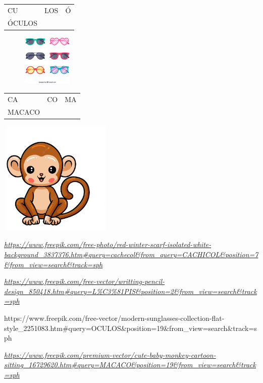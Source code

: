 \begin{longtable}[]{@{}lll@{}}
\toprule
CU & LOS & Ó\tabularnewline
ÓCULOS\tabularnewline
\bottomrule
\end{longtable}

\includegraphics[width=1.78518in,height=0.95594in]{media/image80.png}

\begin{longtable}[]{@{}lll@{}}
\toprule
CA & CO & MA\tabularnewline
MACACO\tabularnewline
\bottomrule
\end{longtable}

\includegraphics[width=2.14688in,height=2.14688in]{media/image81.png}

\href{https://www.freepik.com/free-photo/red-winter-scarf-isolated-white-background_3837376.htm\#query=cachecol\&from_query=CACHICOL\&position=7\&from_view=search\&track=sph}{\emph{https://www.freepik.com/free-photo/red-winter-scarf-isolated-white-background\_3837376.htm\#query=cachecol\&from\_query=CACHICOL\&position=7\&from\_view=search\&track=sph}}

\href{https://www.freepik.com/free-vector/writting-pencil-design_850418.htm\#query=L\%C3\%81PIS\&position=2\&from_view=search\&track=sph}{\emph{https://www.freepik.com/free-vector/writting-pencil-design\_850418.htm\#query=L\%C3\%81PIS\&position=2\&from\_view=search\&track=sph}}

https://www.freepik.com/free-vector/modern-sunglasses-collection-flat-style\_2251083.htm\#query=OCULOS\&position=19\&from\_view=search\&track=sph

\href{https://www.freepik.com/premium-vector/cute-baby-monkey-cartoon-sitting_16729620.htm\#query=MACACO\&position=19\&from_view=search\&track=sph}{\emph{https://www.freepik.com/premium-vector/cute-baby-monkey-cartoon-sitting\_16729620.htm\#query=MACACO\&position=19\&from\_view=search\&track=sph}}

